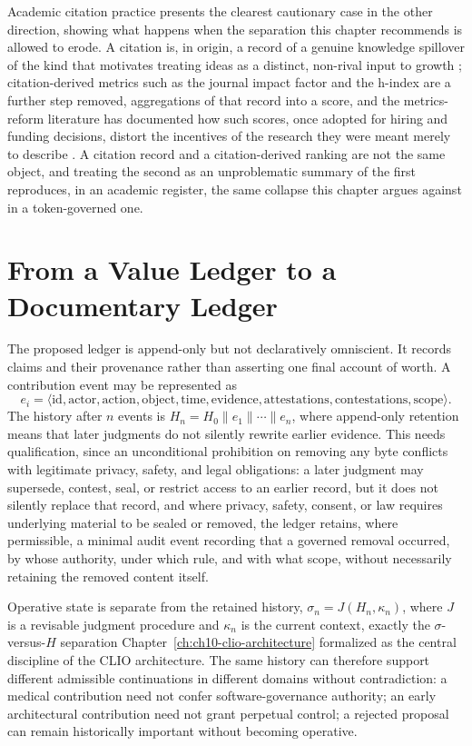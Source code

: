 Academic citation practice presents the clearest cautionary case in the other direction, showing what happens when the separation this chapter recommends is allowed to erode. A citation is, in origin, a record of a genuine knowledge spillover of the kind that motivates treating ideas as a distinct, non-rival input to growth \cite{arrow1962,romer1990}; citation-derived metrics such as the journal impact factor and the h-index are a further step removed, aggregations of that record into a score, and the metrics-reform literature has documented how such scores, once adopted for hiring and funding decisions, distort the incentives of the research they were meant merely to describe \cite{hicks2015}. A citation record and a citation-derived ranking are not the same object, and treating the second as an unproblematic summary of the first reproduces, in an academic register, the same collapse this chapter argues against in a token-governed one.

\section{From a Value Ledger to a Documentary Ledger}

The proposed ledger is append-only but not declaratively omniscient. It records claims and their provenance rather than asserting one final account of worth. A contribution event may be represented as
\[
e_i = \langle \mathrm{id}, \mathrm{actor}, \mathrm{action}, \mathrm{object}, \mathrm{time}, \mathrm{evidence}, \mathrm{attestations}, \mathrm{contestations}, \mathrm{scope} \rangle.
\]
The history after $n$ events is $H_n = H_0 \parallel e_1 \parallel \cdots \parallel e_n$, where append-only retention means that later judgments do not silently rewrite earlier evidence. This needs qualification, since an unconditional prohibition on removing any byte conflicts with legitimate privacy, safety, and legal obligations: a later judgment may supersede, contest, seal, or restrict access to an earlier record, but it does not silently replace that record, and where privacy, safety, consent, or law requires underlying material to be sealed or removed, the ledger retains, where permissible, a minimal audit event recording that a governed removal occurred, by whose authority, under which rule, and with what scope, without necessarily retaining the removed content itself.

Operative state is separate from the retained history, $\sigma_n = J(H_n, \kappa_n)$, where $J$ is a revisable judgment procedure and $\kappa_n$ is the current context, exactly the $\sigma$-versus-$H$ separation Chapter~\ref{ch:ch10-clio-architecture} formalized as the central discipline of the CLIO architecture. The same history can therefore support different admissible continuations in different domains without contradiction: a medical contribution need not confer software-governance authority; an early architectural contribution need not grant perpetual control; a rejected proposal can remain historically important without becoming operative.

